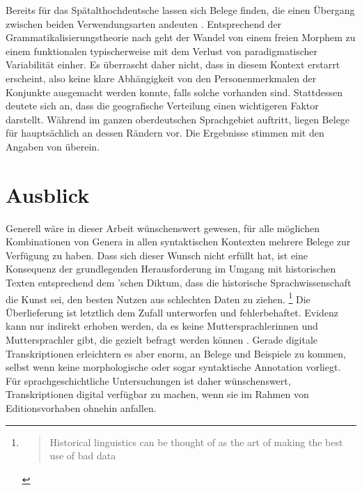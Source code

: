 Bereits für das Spätalthochdeutsche lassen sich Belege
finden, die einen Übergang zwischen beiden Verwendungsarten
andeuten \autocite[vgl.\ die Beispiele in][627]{ksw2}. Entsprechend der
Grammatikalisierungstheorie nach \citet[146--150]{lehmann2015} geht der Wandel
von einem freien Morphem zu einem funktionalen typischerweise mit dem Verlust
von paradigmatischer Variabilität einher. Es überrascht daher nicht, dass
 in diesem Kontext erstarrt erscheint, also keine klare
Abhängigkeit von den Personenmerkmalen der Konjunkte ausgemacht werden konnte,
falls solche vorhanden sind. Stattdessen deutete sich an, dass die
geografische Verteilung
einen wichtigeren Faktor darstellt. Während  im ganzen
oberdeutschen Sprachgebiet auftritt, liegen Belege für
 hauptsächlich an dessen Rändern vor. Die Ergebnisse stimmen mit
den Angaben von \citet[627--628]{ksw2} überein.

\section{Ausblick}

Generell wäre in dieser Arbeit wünschenswert gewesen, für alle möglichen
Kombinationen von Genera in allen syntaktischen Kontexten mehrere
Belege zur Verfügung zu haben. Dass sich dieser Wunsch nicht erfüllt hat, ist
eine Konsequenz der grundlegenden Herausforderung im Umgang mit historischen
Texten entsprechend dem \citeauthor{labov1994}'schen Diktum, dass die
historische Sprachwissenschaft die Kunst sei, den besten Nutzen aus schlechten
Daten zu ziehen.%
%
	\footnote{\foreignblockcquote{english}[11]{labov1994}{Historical
		linguistics can \textelp{} be thought of as the art of making the best
		use of bad data}.%
	}
%
Die Überlieferung ist letztlich dem Zufall unterworfen und fehlerbehaftet.
Evidenz kann nur indirekt erhoben werden, da es keine Muttersprachlerinnen und
Muttersprachler gibt, die gezielt befragt werden können
\autocite[11]{labov1994}. Gerade digitale Transkriptionen erleichtern es aber
enorm, an Belege und Beispiele zu kommen, selbst wenn keine morphologische oder
sogar syntaktische Annotation vorliegt.
Für sprachgeschichtliche Untersuchungen ist daher wünschenswert,
Transkriptionen digital verfügbar zu machen, wenn sie im Rahmen von
Editionsvorhaben ohnehin anfallen.

